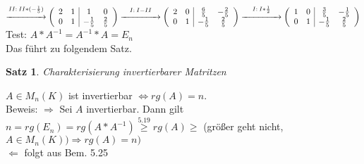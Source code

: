 \documentclass[a4paper,11pt]{article}
\newtheorem{satz}[definition]{Satz}
\begin{document}
$\overset{II:\:II*(-\frac{1}{5})}{\xrightarrow{\hspace*{1.5cm}}}\left(\begin{array}{cc|cc}2&1&1&0\\0&1&-\frac{1}{5}&\frac{2}{5}\end{array}\right)\overset{I:\:I-II}{\xrightarrow{\hspace*{1.5cm}}}\left(\begin{array}{cc|cc}2&0&\frac{6}{5}&-\frac{2}{5}\\0&1&-\frac{1}{5}&\frac{2}{5}\end{array}\right)\overset{I:\:I*\frac{1}{2}}{\xrightarrow{\hspace*{1.5cm}}}\left(\begin{array}{cc|cc}1&0&\frac{3}{5}&-\frac{1}{5}\\0&1&-\frac{1}{5}&\frac{2}{5}\end{array}\right)$ \\
Test: $A*A^{-1}=A^{-1}*A=E_n$ \\
Das führt zu folgendem Satz.
\begin{satz}
Charakterisierung invertierbarer Matritzen
\end{satz}
$A\in M_n(K)$ ist invertierbar $\Leftrightarrow rg(A)=n$. \\
Beweis: $\Rightarrow$ Sei $A$ invertierbar. Dann gilt $n=rg(E_n)=rg(A*A^{-1})\overset{5.19}{\geq}rg(A)\geq$ (größer geht nicht, $A\in M_n(K))\Rightarrow rg(A)=n)$ \\
$\Leftarrow$ folgt aus Bem. 5.25
\newpage
\end{document}
